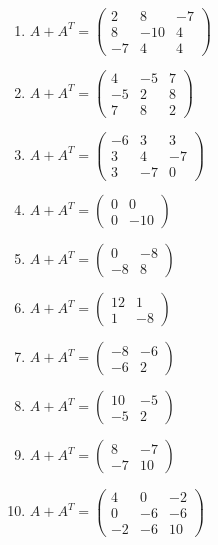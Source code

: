 \begin{enumerate}[label=\arabic*., leftmargin=*, itemsep=1pt]
\item $A+A^T=\left(\begin{smallmatrix}2 & 8 & -7\\ 8 & -10 & 4\\ -7 & 4 & 4\end{smallmatrix}\right)$
\item $A+A^T=\left(\begin{smallmatrix}4 & -5 & 7\\ -5 & 2 & 8\\ 7 & 8 & 2\end{smallmatrix}\right)$
\item $A+A^T=\left(\begin{smallmatrix}-6 & 3 & 3\\ 3 & 4 & -7\\ 3 & -7 & 0\end{smallmatrix}\right)$
\item $A+A^T=\left(\begin{smallmatrix}0 & 0\\ 0 & -10\end{smallmatrix}\right)$
\item $A+A^T=\left(\begin{smallmatrix}0 & -8\\ -8 & 8\end{smallmatrix}\right)$
\item $A+A^T=\left(\begin{smallmatrix}12 & 1\\ 1 & -8\end{smallmatrix}\right)$
\item $A+A^T=\left(\begin{smallmatrix}-8 & -6\\ -6 & 2\end{smallmatrix}\right)$
\item $A+A^T=\left(\begin{smallmatrix}10 & -5\\ -5 & 2\end{smallmatrix}\right)$
\item $A+A^T=\left(\begin{smallmatrix}8 & -7\\ -7 & 10\end{smallmatrix}\right)$
\item $A+A^T=\left(\begin{smallmatrix}4 & 0 & -2\\ 0 & -6 & -6\\ -2 & -6 & 10\end{smallmatrix}\right)$
\end{enumerate}
